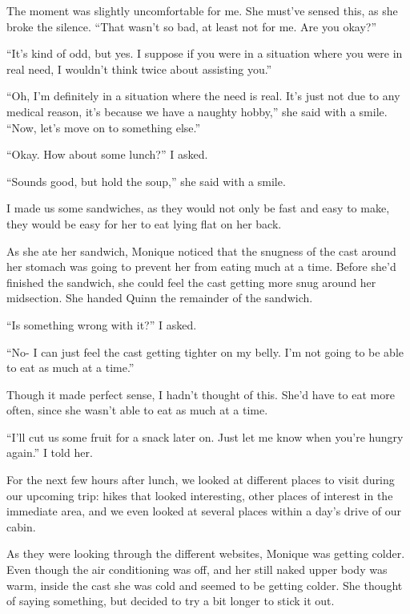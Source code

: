 The moment was slightly uncomfortable for me. She must've sensed this, as she broke the
silence. ``That wasn't so bad, at least not for me. Are you okay?''

``It's kind of odd, but yes. I suppose if you were in a situation where you were in real
need, I wouldn't think twice about assisting you.''

``Oh, I'm definitely in a situation where the need is real. It's just not due to any medical
reason, it's because we have a naughty hobby,'' she said with a smile. ``Now, let's move on to
something else.''

``Okay. How about some lunch?'' I asked.

``Sounds good, but hold the soup,'' she said with a smile.

I made us some sandwiches, as they would not only be fast and easy to make, they would be
easy for her to eat lying flat on her back.

\begin{thought}
As she ate her sandwich, Monique noticed that the snugness of the cast around her stomach
was going to prevent her from eating much at a time. Before she'd finished the sandwich, she
could feel the cast getting more snug around her midsection. She handed Quinn the remainder of
the sandwich.
\end{thought}

``Is something wrong with it?'' I asked.

``No- I can just feel the cast getting tighter on my belly. I'm not going to be able to eat
as much at a time.''

Though it made perfect sense, I hadn't thought of this. She'd have to eat more often, since
she wasn't able to eat as much at a time.

``I'll cut us some fruit for a snack later on. Just let me know when you're hungry again.'' I
told her.

For the next few hours after lunch, we looked at different places to visit during our
upcoming trip: hikes that looked interesting, other places of interest in the immediate area,
and we even looked at several places within a day's drive of our cabin.

\begin{thought}
As they were looking through the different websites, Monique was getting colder. Even
though the air conditioning was off, and her still naked upper body was warm, inside the cast
she was cold and seemed to be getting colder. She thought of saying something, but decided to
try a bit longer to stick it out.
\end{thought}

